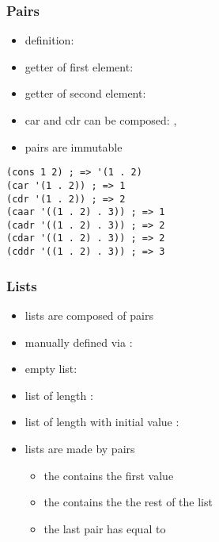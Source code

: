 \documentclass[a4paper,landscape,10pt]{article}
\begin{document}
\begin{multicols*}{2}
  \subsubsection{Pairs}

  \begin{itemize}
    \item definition: 
    \item getter of first element: 
    \item getter of second element: 
    \item car and cdr can be composed: , 
    \item pairs are immutable
  \end{itemize}

  \begin{lstlisting}[language=Racket]
(cons 1 2) ; => '(1 . 2)
(car '(1 . 2)) ; => 1
(cdr '(1 . 2)) ; => 2
(caar '((1 . 2) . 3)) ; => 1
(cadr '((1 . 2) . 3)) ; => 2
(cdar '((1 . 2) . 3)) ; => 2
(cddr '((1 . 2) . 3)) ; => 3
\end{lstlisting}

  \subsubsection{Lists}

  \begin{itemize}
    \item lists are composed of pairs
    \item manually defined via : 
    \item empty list: 
    \item list of length : 
    \item list of length  with initial value : 
    \item lists are made by pairs
          \begin{itemize} \item the  contains the first value
            \item the  contains the the rest of the list
            \item the last pair has  equal to 
          \end{itemize}
  \end{itemize}


\end{multicols*}
\end{document}
